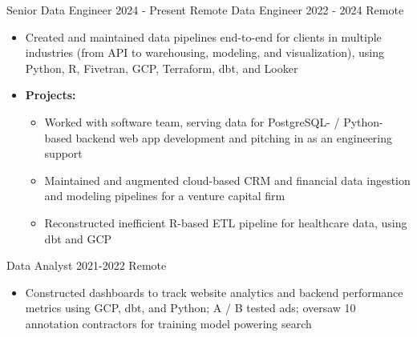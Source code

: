 \documentclass[8pt,a4paper]{altacv}
\begin{document}
                {Senior Data Engineer}
                {2024 - Present}
                {Remote}
                {}
        \vspace{-8pt}
        \cvevent{}
                {Data Engineer}
                {2022 - 2024}
                {Remote}
                {\begin{itemize}[leftmargin=0pt]
                \renewcommand\labelitemi{}
                    \item Created and maintained data pipelines end-to-end for clients in multiple industries (from API to warehousing, modeling, and visualization), using Python, R, Fivetran, GCP, Terraform, dbt, and Looker
                    \vspace{1.5pt}
                    \item {\bfseries\color{emphasis}Projects:}
                        \begin{itemize}[leftmargin=2.25em]
                        \smallskip
                        \item[\raisebox{-2pt}{\color{accent}\Large\faCode}] Worked with software team, serving data for PostgreSQL- / Python-based backend web app development and pitching in as an engineering support
                        \smallskip
                        \item[\raisebox{-2pt}{\color{accent}\Large\faCloud}] Maintained and augmented cloud-based CRM and financial data ingestion and modeling pipelines for a venture capital firm
                            \smallskip
                        \item[\raisebox{-2pt}{\color{accent}\Large\faGears}] Reconstructed inefficient R-based ETL pipeline for healthcare data, using dbt and GCP
                    \end{itemize}
                \end{itemize}}
            
                {Data Analyst}
                {2021-2022}
                {Remote}
                {\begin{itemize}[leftmargin=0pt]
                \renewcommand\labelitemi{}
                    \item Constructed dashboards to track website analytics and backend performance metrics using GCP, dbt, and Python; A / B tested ads; oversaw 10 annotation contractors for training model powering search
                \end{itemize}}
            
\end{document}
